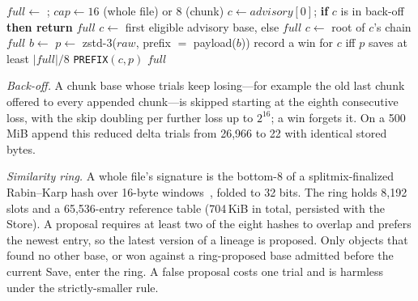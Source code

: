 \begin{algorithm}[h]
\caption{Representation selection for one payload object}
\label{alg:select}
\small
\begin{algorithmic}[1]
  \State $\mathit{full} \gets$ ; $\mathit{cap} \gets 16$ (whole file) or $8$ (chunk)
    \State $c \gets \mathit{advisory}[0]$; \textbf{if} $c$ is in back-off \textbf{then return} $\mathit{full}$
  \Else
    \State $c \gets$ first eligible advisory base, else 
  \EndIf
   \Return $\mathit{full}$ \EndIf
    \State $c \gets$ root of $c$'s chain 
  \EndIf
   \Return $\mathit{full}$ \EndIf
  \State $b \gets$  
  \State $p \gets$ zstd-3($\mathit{raw}$, prefix $=$ payload($b$)) 
   record a win for $c$ iff $p$ saves at least $|\mathit{full}|/8$ \EndIf
   \Return \texttt{PREFIX}$(c, p)$  \EndIf
  \State \Return $\mathit{full}$
\EndFunction
\end{algorithmic}
\end{algorithm}

\emph{Back-off.} A chunk base whose trials keep losing---for example the old last chunk
offered to every appended chunk---is skipped starting at the eighth consecutive loss,
with the skip doubling per further loss up to $2^{16}$; a win forgets it. On a 500\,MiB
append this reduced delta trials from 26,966 to 22 with identical stored bytes.

\emph{Similarity ring.} A whole file's signature is the bottom-8 of a splitmix-finalized
Rabin--Karp hash over 16-byte windows~\cite{broder}, folded to 32 bits. The ring holds
8,192 slots and a 65,536-entry reference table (704\,KiB in total, persisted with the
Store). A proposal requires at least two of the eight hashes to overlap and prefers the
newest entry, so the latest version of a lineage is proposed. Only objects that found no
other base, or won against a ring-proposed base admitted before the current Save, enter
the ring. A false proposal costs one trial and is harmless under the strictly-smaller
rule.

